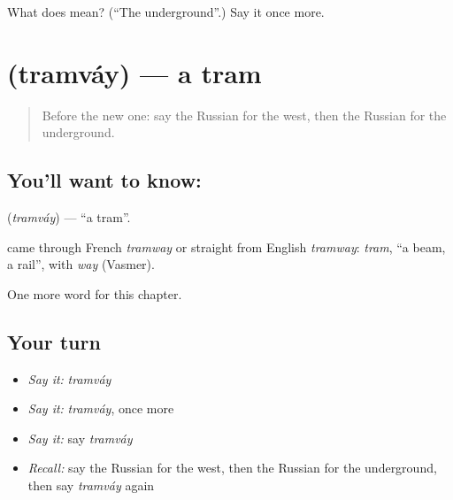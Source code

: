 \begin{tcolorbox}[breakable,colback=teal!4,colframe=teal!35!black,title={Before you move on}]
What does  mean? (\textquotedblleft{}The underground\textquotedblright{}.) Say it once more.
\end{tcolorbox}
\section[\texorpdfstring{\ru{трамвай} (tramváy)}{трамвай (tramváy)}]{ (tramváy) — a tram}

\label{lesson:RU-C91-tram}



\begin{quote}
Before the new one: say the Russian for the west, then the Russian for the underground.
\end{quote}

\subsection*{You'll want to know: }
\textbf{} (\emph{tramváy}) — \textquotedblleft{}a tram\textquotedblright{}.

\begin{cousinweb}
\textbf{} came through French \emph{tramway} or straight from English \emph{tramway}: \emph{tram}, \textquotedblleft{}a beam, a rail\textquotedblright{}, with \emph{way} (Vasmer).
\end{cousinweb}

\begin{grammarlens}[title={What you've built}]
One more word for this chapter.
\end{grammarlens}

\subsection*{Your turn}
\begin{itemize}
\raggedright
  \item \emph{Say it:} \emph{tramváy}
  \item \emph{Say it:} \emph{tramváy}, once more
  \item \emph{Say it:} say \emph{tramváy}
  \item \emph{Recall:} say the Russian for the west, then the Russian for the underground, then say \emph{tramváy} again
\end{itemize}

